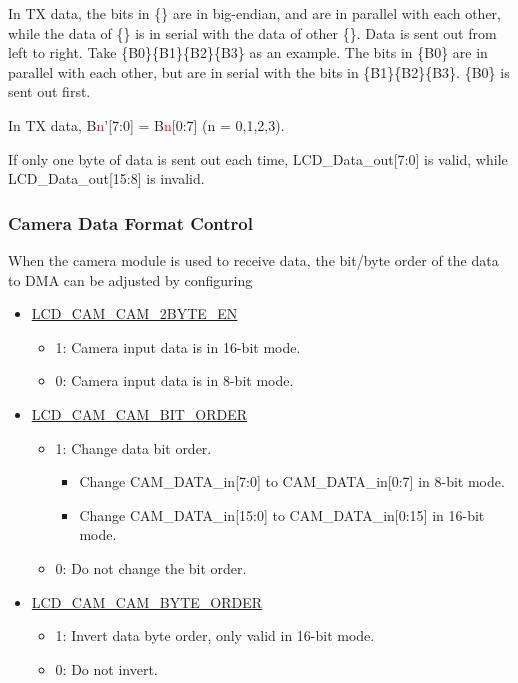 \documentclass[main\_\_EN.tex]{subfiles}
\begin{document}
\begin{table}[H]
\begin{threeparttable}
\begin{tablenotes}
        \item[3] In TX data, the bits in \{\} are in big-endian, and are in parallel with each other, while the data of \{\} is in serial with the data of other \{\}. Data is sent out from left to right. Take \{B0\}\{B1\}\{B2\}\{B3\} as an example. The bits in \{B0\} are in parallel with each other, but are in serial with the bits in \{B1\}\{B2\}\{B3\}. \{B0\} is sent out first.
        \item[4] In TX data, B{\textcolor{red}{n}}'[7:0] = B{\textcolor{red}{n}}[0:7] (n = 0,1,2,3).
    \end{tablenotes}
    \end{threeparttable}
\end{table}

\begin{tiplisting}
If only one byte of data is sent out each time, LCD\_Data\_out[7:0] is valid, while LCD\_Data\_out[15:8] is invalid.
\end{tiplisting}

\subsubsection{Camera Data Format Control} \label{cam_data_control}
When the camera module is used to receive data, the bit/byte order of the data to DMA can be adjusted by configuring
\begin{itemize}
    \item \hyperref[fielddesc:LCDCAMCAM2BYTEEN]{LCD\_CAM\_CAM\_2BYTE\_EN}
    \begin{itemize}
        \item 1: Camera input data is in 16-bit mode.
        \item 0: Camera input data is in 8-bit mode.
    \end{itemize}
    \item \hyperref[fielddesc:LCDCAMCAMBITORDER]{LCD\_CAM\_CAM\_BIT\_ORDER}
        \begin{itemize}
        \item 1: Change data bit order.
        \begin{itemize}
            \item Change CAM\_DATA\_in[7:0] to CAM\_DATA\_in[0:7] in 8-bit mode.
            \item Change CAM\_DATA\_in[15:0] to CAM\_DATA\_in[0:15] in 16-bit mode.
        \end{itemize}
        \item 0: Do not change the bit order.
    \end{itemize}
    \item \hyperref[fielddesc:LCDCAMCAMBYTEORDER]{LCD\_CAM\_CAM\_BYTE\_ORDER}
    \begin{itemize}
        \item 1: Invert data byte order, only valid in 16-bit mode.
        \item 0: Do not invert.
    \end{itemize}
\end{itemize}
\end{document}
